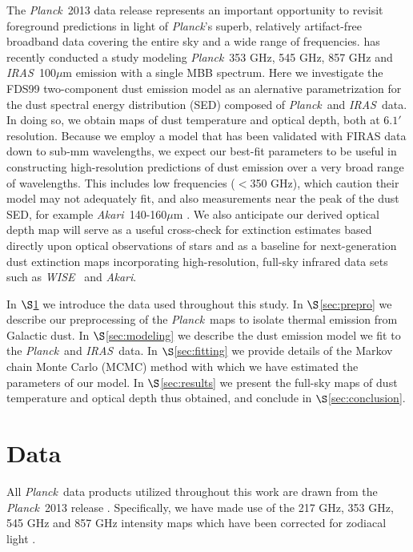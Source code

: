 \documentclass{emulateapj}
\newcommand{\IRAS}{{\it IRAS}}
\newcommand{\PLANCK}{{\it Planck}}
\newcommand{\AKARI}{{\it Akari}}
\newcommand{\WISE}{{\it WISE}}
\begin{document}
The \PLANCK~2013 data release \citep{planck2013} represents an important 
opportunity to revisit foreground predictions in light of \PLANCK's superb, 
relatively artifact-free broadband data covering the entire sky and a wide 
range of frequencies. \cite{planckdust} has recently conducted a study modeling
\PLANCK~353 GHz, 545 GHz, 857 GHz and \IRAS~100$\mu$m emission with a single
MBB spectrum. Here we investigate the FDS99 two-component dust emission model 
as an alernative parametrization for the dust spectral energy distribution 
(SED) composed  of \PLANCK~and \IRAS~data. In doing so, we obtain maps of dust 
temperature and optical depth, both at $6.1'$ resolution. Because we employ a 
model that has been validated with FIRAS data down to sub-mm wavelengths, we 
expect our best-fit parameters to be useful in constructing high-resolution 
predictions of dust emission over a very broad range of wavelengths. This 
includes low frequencies ($<$350 GHz), which \cite{planckdust} caution their 
model may not adequately fit, and also measurements near the peak of the dust 
SED, for example \AKARI~140-160$\mu$m \citep{akari}. We also anticipate our 
derived optical depth map will serve as a useful cross-check for extinction 
estimates based directly upon optical observations of stars
\citep[e.g.][]{green14} and as a baseline for next-generation dust extinction 
maps incorporating high-resolution, full-sky infrared data sets such as 
\WISE~\citep{wright10, meisner14} and \AKARI.


In $\S$\ref{sec:data} we introduce the data used throughout this study. In 
$\S$\ref{sec:prepro} we describe our preprocessing of the \PLANCK~maps to 
isolate thermal emission from Galactic dust. In $\S$\ref{sec:modeling} we 
describe the dust emission model we fit to the \PLANCK~and \IRAS~data. In 
$\S$\ref{sec:fitting} we provide details of the Markov chain Monte Carlo (MCMC)
 method with which we have estimated the parameters of our model. In 
$\S$\ref{sec:results} we present the full-sky maps of dust temperature and 
optical depth thus obtained, and conclude in $\S$\ref{sec:conclusion}.

 \section{Data}
\label{sec:data}
All \PLANCK~data products utilized throughout this work are drawn from the 
\PLANCK~2013 release \citep{planck2013}. Specifically, we have made use 
of the 217 GHz, 353 GHz, 545 GHz and 857 GHz intensity maps which have been 
corrected for zodiacal light 
\citep[\texttt{R1.10\_nominal\_ZodiCorrected},][]{planckzodi}.
\end{document}
